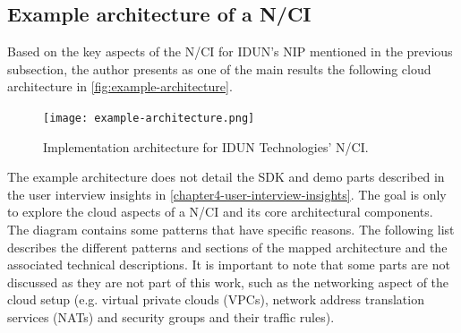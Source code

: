 \subsection{Example architecture of a N/CI}
\label{chapter5-example-architecture-of-a-nci}

Based on the key aspects of the N/CI for IDUN's NIP mentioned in the previous subsection, the author presents as one of the main results the following cloud architecture in \autoref{fig:example-architecture}.

\begin{figure}[!ht]
  \centering
  \texttt{[image: example-architecture.png]}
  \caption{Implementation architecture for IDUN Technologies' N/CI.}
  \label{fig:example-architecture}
\end{figure}

The example architecture does not detail the SDK and demo parts described in the user interview insights in \autoref{chapter4-user-interview-insights}. The goal is only to explore the cloud aspects of a N/CI and its core architectural components. The diagram contains some patterns that have specific reasons. The following list describes the different patterns and sections of the mapped architecture and the associated technical descriptions. It is important to note that some parts are not discussed as they are not part of this work, such as the networking aspect of the cloud setup (e.g. virtual private clouds (VPCs), network address translation services (NATs) and security groups and their traffic rules).

